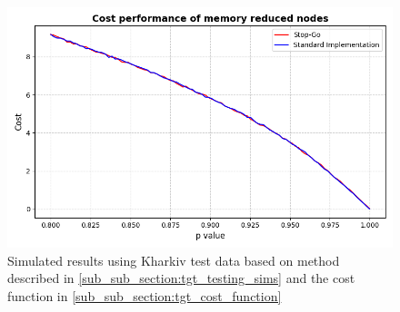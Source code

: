 \begin{figure}[htbp]
  \centering
  \includegraphics[width=1\textwidth]{figs/Thomas/Return To Safety/Reduced Nodes.png}
  \caption[Memory Reduced Nodes Performance]{Simulated results using Kharkiv test data based on method described in \ref{sub_sub_section:tgt_testing_sims} and the cost function in \ref{sub_sub_section:tgt_cost_function}}
  \label{fig:Reduced Nodes}
\end{figure}